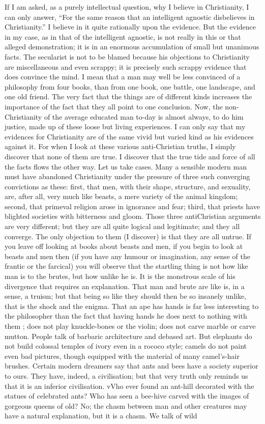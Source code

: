 \documentclass{book}
\begin{document}
If I am asked, as a purely intellectual question, why I believe in Christianity, I can only answer, “For the same reason that an intelligent agnostic disbelieves in Christianity.” I believe in it quite rationally upon the evidence. But the evidence in my case, as in that of the intelligent agnostic, is not really in this or that alleged demonstration; it is in an enormous accumulation of small but unanimous facts. The secularist is not to be blamed because his objections to Christianity are miscellaneous and even scrappy; it is precisely such scrappy evidence that does convince the mind. I mean that a man may well be less convinced of a philosophy from four books, than from one book, one battle, one landscape, and one old friend. The very fact that the things are of different kinds increases the importance of the fact that they all point to one conclusion. Now, the non-Christianity of the average educated man to-day is almost always, to do him justice, made up of these loose but living experiences. I can only say that my evidences for Christianity are of the same vivid but varied kind as his evidences against it. For when I look at these various anti-Christian truths, I simply discover that none of them are true. I discover that the true tide and force of all the facts flows the other way. Let us take cases. Many a sensible modern man must have abandoned Christianity under the pressure of three such converging convictions as these: first, that men, with their shape, structure, and sexuality, are, after all, very much like beasts, a mere variety of the animal kingdom; second, that primeval religion arose in ignorance and fear; third, that priests have blighted societies with bitterness and gloom. Those three antiChristian arguments are very different; but they are all quite logical and legitimate; and they all converge. The only objection to them (I discover) is that they are all untrue. If you leave off looking at books about beasts and men, if you begin to look at beasts and men then (if you have any humour or imagination, any sense of the frantic or the farcical) you will observe that the startling thing is not how like man is to the brutes, but how unlike he is. It is the monstrous scale of his divergence that requires an explanation. That man and brute are like is, in a sense, a truism; but that being so like they should then be so insanely unlike, that is the shock and the enigma. That an ape has hands is far less interesting to the philosopher than the fact that having hands he does next to nothing with them ; does not play knuckle-bones or the violin; does not carve marble or carve mutton. People talk of barbaric architecture and debased art. But elephants do not build colossal temples of ivory even in a rococo style; camels do not paint even bad pictures, though equipped with the material of many camel’s-hair brushes. Certain modern dreamers say that ants and bees have a society superior to ours. They have, indeed, a civilisation; but that very truth only reminds us that it is an inferior civilisation. vVho ever found an ant-hill decorated with the statues of celebrated ants? Who has seen a bee-hive carved with the images of gorgeous queens of old? No; the chasm between man and other creatures may have a natural explanation, but it is a chasm. We talk of wild 
\end{document}
